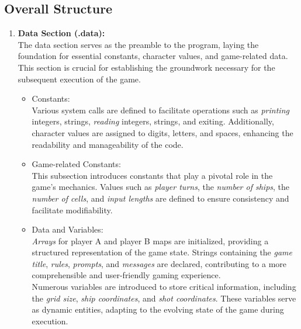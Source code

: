 \subsection{Overall Structure}
\begin{enumerate}
    \item \textbf{Data Section (.data):} \\
    The data section serves as the preamble to the program, laying the foundation for essential constants, character values, and game-related data. This section is crucial for establishing the groundwork necessary for the subsequent execution of the game.
        \begin{itemize}
            \item Constants: \\
            Various system calls are defined to facilitate operations such as \textit{printing} integers, strings, \textit{reading} integers, strings, and exiting. Additionally, character values are assigned to digits, letters, and spaces, enhancing the readability and manageability of the code.
            \item Game-related Constants: \\
            This subsection introduces constants that play a pivotal role in the game's mechanics. Values such as \textit{player turns}, the \textit{number of ships}, the \textit{number of cells}, and \textit{input lengths} are defined to ensure consistency and facilitate modifiability.
            \item Data and Variables: \\
            \textit{Arrays} for player A and player B maps are initialized, providing a structured representation of the game state. Strings containing the \textit{game title}, \textit{rules}, \textit{prompts}, and \textit{messages} are declared, contributing to a more comprehensible and user-friendly gaming experience.\\
            Numerous variables are introduced to store critical information, including the \textit{grid size}, \textit{ship coordinates}, and \textit{shot coordinates}. These variables serve as dynamic entities, adapting to the evolving state of the game during execution.
        \end{itemize}


\end{enumerate}
